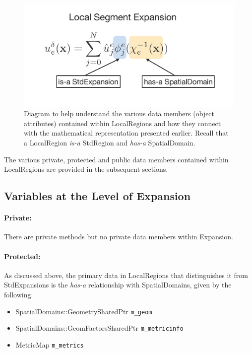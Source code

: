 \begin{figure}[htb]
\centering
\includegraphics[width=6in]{img/LocalExpansion.png}
\caption{Diagram to help understand the various data members (object attributes) contained within LocalRegions and how they connect with the mathematical representation presented earlier.  Recall that a LocalRegion {\em is-a} StdRegion and {\em has-a} SpatialDomain.}
\label{localregions:localexpansion:stdexpansion}
\end{figure}

The various private, protected and public data members contained within LocalRegions are provided in the subsequent sections.

\subsection{Variables at the Level of Expansion}

\paragraph{Private:}

There are private methods but no private data members within Expansion.

\paragraph{Protected:}

As discussed above, the primary data in LocalRegions that distinguishes it from StdExpansions is the {\em has-a} relationship with SpatialDomains, given by the following:

\begin{itemize}
\item SpatialDomains::GeometrySharedPtr  \verb+m_geom+
%
\item SpatialDomains::GeomFactorsSharedPtr \verb+m_metricinfo+
%
\item MetricMap \verb+m_metrics+
\end{itemize}


